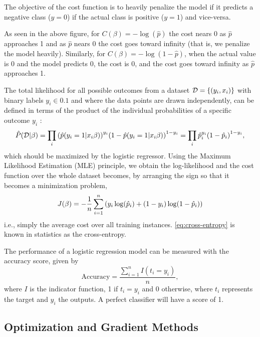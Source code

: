 The objective of the cost function is to heavily penalize the model if it predicts a negative class ($y=0$) if the actual class is positive ($y=1$) and vice-versa. \cite{Hands-onML}

As seen in the above figure, for $C(\beta) = - \log(\hat{p})$ the cost nears 0 as $\hat{p}$ approaches 1 and as $\hat{p}$ nears 0 the cost goes toward infinity (that is, we penalize the model heavily). Similarly, for $C(\beta) = - \log(1 - \hat{p})$, when the actual value is 0 and the model predicts 0, the cost is 0, and the cost goes toward infinity as $\hat{p}$ approaches 1.

The total likelihood for all possible outcomes from a dataset $\mathcal{D} = \qty{\qty(y_i, x_i)}$ with binary labels $y_i \in \qty{0,1}$ and where the data points are drawn independently, can be defined in terms of the product of the individual probabilities of a specific outcome $y_i$ \cite{logreglec}:
\begin{equation}
    \hat{P} (\mathcal{D} | \beta) = \prod_i \qty(\hat{p}\qty(y_i = 1 | x_i \beta))^{y_i} \qty(1 - \hat{p}\qty(y_i = 1 | x_i \beta))^{1-y_i} = \prod_i \hat{p}_i^{y_i} \qty(1 - \hat{p}_i)^{1-y_i},
\end{equation}
which should be maximized by the logistic regressor. Using the Maximum Likelihood Estimation (MLE) principle, we obtain the log-likelihood and the cost function over the whole dataset becomes, by arranging the sign so that it becomes a minimization problem,
\begin{equation}\label{eq:cross-entropy}
    J (\beta) = - \frac{1}{n} \sum_{i=1}^n \qty(y_i \log(\hat{p}_i) + (1-y_i) \log(1 - \hat{p}_i) )
\end{equation}
i.e., simply the average cost over all training instances. \autoref{eq:cross-entropy} is known in statistics as the cross-entropy.



The performance of a logistic regression model can be measured with the accuracy score, given by
\begin{equation}\label{eq:accuracy score}
    \text{Accuracy} = \frac{\sum_{i=1}^n I(t_i = y_i)}{n},
\end{equation}
where $I$ is the indicator function, 1 if $t_i = y_i$ and 0 otherwise, where $t_i$ represents the target and $y_i$ the outputs. A perfect classifier will have a score of 1.



\subsection{Optimization and Gradient Methods}\label{sec:optim theory}

